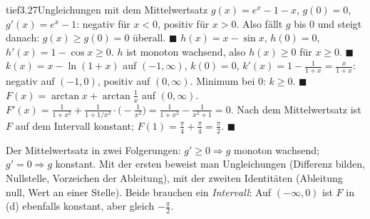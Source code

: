 \begin{loesungkarte}{tief}{3.27}{Ungleichungen mit dem Mittelwertsatz}
$g(x) = e^{x} - 1 - x$, $g(0) = 0$, $g'(x) = e^{x} - 1$: negativ für $x < 0$, positiv für $x > 0$. Also fällt $g$ bis $0$ und steigt danach: $g(x)\ge g(0) = 0$ überall. $\blacksquare$
$h(x) = x - \sin x$, $h(0) = 0$, $h'(x) = 1 - \cos x\ge0$. $h$ ist monoton wachsend, also $h(x)\ge0$ für $x\ge0$. $\blacksquare$
$k(x) = x - \ln(1 + x)$ auf $(-1, \infty)$, $k(0) = 0$, $k'(x) = 1 - \frac1{1 + x} = \frac x{1 + x}$: negativ auf $(-1, 0)$, positiv auf $(0, \infty)$. Minimum bei $0$: $k\ge0$. $\blacksquare$
$F(x) = \arctan x + \arctan\frac1x$ auf $(0, \infty)$. $F'(x) = \frac1{1 + x^{2}} + \frac1{1 + 1/x^{2}}\cdot\bigl(-\frac1{x^{2}}\bigr) = \frac1{1 + x^{2}} - \frac1{x^{2} + 1} = 0$. Nach dem Mittelwertsatz ist $F$ auf dem Intervall konstant; $F(1) = \frac\pi4 + \frac\pi4 = \frac\pi2$. $\blacksquare$
\begin{mitnehmen}\kastentext
Der Mittelwertsatz in zwei Folgerungen: $g'\ge0\Rightarrow g$ monoton wachsend; $g' = 0\Rightarrow g$ konstant. Mit der ersten beweist man Ungleichungen (Differenz bilden, Nullstelle, Vorzeichen der Ableitung), mit der zweiten Identitäten (Ableitung null, Wert an einer Stelle). Beide brauchen ein \emph{Intervall}: Auf $(-\infty, 0)$ ist $F$ in (d) ebenfalls konstant, aber gleich $-\frac\pi2$.
\end{mitnehmen}
\end{loesungkarte}

